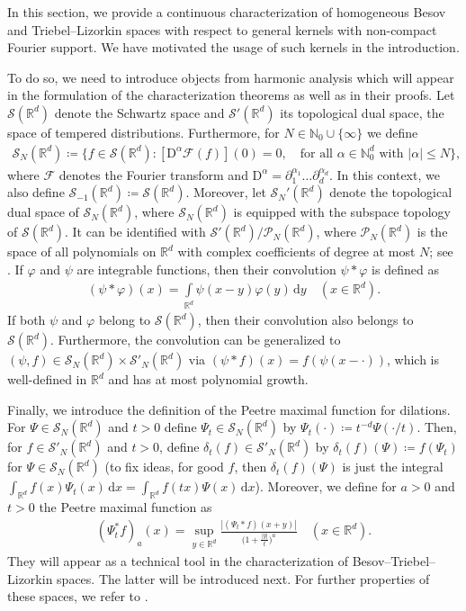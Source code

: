 \documentclass[11pt, leqno,parskip=half]{amsart}
\theoremstyle{definition}
\newcommand{\IR}{\mathbb{R}}
\newcommand{\IN}{\mathbb{N}}
\newcommand{\cF}{\mathcal{F}}
\newcommand{\cS}{\mathcal{S}}
\newcommand{\cP}{\mathcal{P}}
\newcommand{\D}{{\mathrm{D}}}
\renewcommand{\d}{\mathrm{d}}
\numberwithin{equation}{section}
\begin{document}
\noindent In this section, we provide a continuous characterization of homogeneous Besov and Triebel--Lizorkin spaces with respect to general kernels with non-compact Fourier support. We have motivated the usage of such kernels in the introduction.

To do so, we need to introduce objects from harmonic analysis which will appear in the formulation of the characterization theorems as well as in their proofs.
Let $\cS(\IR^d)$ denote the Schwartz space and $\cS'(\IR^d)$ its topological dual space, the space of tempered distributions. Furthermore, for $N\in\IN_0 \cup \{\infty\}$ we define
\begin{align*}
    \cS_N(\IR^d) \coloneqq \{ f \in \cS(\IR^d): [\D^\alpha \cF(f)](0) = 0, \quad \text{for all $\alpha\in \IN_0^d$ with $|\alpha|\leq N$}\},
\end{align*}
where $\cF$ denotes the Fourier transform and $\D^\alpha = \partial_1^{\alpha_1} \dots \partial_d^{\alpha_d}$. In this context, we also define $\cS_{-1}(\IR^d) \coloneqq \cS(\IR^d)$. Moreover, let $\cS_N'(\IR^d)$ denote the topological dual space of $\cS_N(\IR^d)$, where $\cS_N(\IR^d)$ is equipped with the subspace topology of $\cS(\IR^d)$. It can be identified with $\cS'(\IR^d)/\cP_N(\IR^d)$, where $\cP_N(\IR^d)$ is the space of all polynomials on $\IR^d$ with complex coefficients of degree at most $N$; see \cite[Chap.\@ 5]{Triebel1}. If $\varphi$ and $\psi$ are integrable functions, then their convolution $\psi\ast \varphi$ is defined as
\begin{align*}
    (\psi\ast \varphi)(x) = \int\limits_{\IR^d} \psi(x-y)\varphi(y)\,\d y \quad (x\in\IR^d).
\end{align*}
If both $\psi$ and $\varphi$ belong to $\cS(\IR^d)$, then their convolution also belongs to $\cS(\IR^d)$. Furthermore, the convolution can be generalized to $(\psi, f ) \in \cS_N(\IR^d)\times \cS'_N(\IR^d)$ via $(\psi\ast f)(x) = f(\psi(x-\cdot))$, which is well-defined in $\IR^d$ and has at most polynomial growth.

Finally, we introduce the definition of the Peetre maximal function for dilations. For $\Psi\in \cS_N(\IR^d)$ and $t>0$ define $\Psi_t\in \cS_N(\IR^d)$ by $\Psi_t(\cdot) \coloneqq t^{-d}\Psi(\cdot/t)$. Then, for $f\in \cS'_N(\IR^d)$ and $t>0$, define $\delta_t(f)\in \cS'_N(\IR^d)$ by $\delta_t(f)(\Psi) \coloneqq f(\Psi_t)$ for $\Psi\in \cS_N(\IR^d)$  (to fix ideas, for good $f$, then $\delta_t(f)(\Psi)$ is just the integral $\int_{\IR^d} f(x) \Psi_t(x)\, \d x =\int_{\IR^d} f(tx) \Psi(x)\, \d x$). Moreover, we define for $a>0$ and $t>0$ the Peetre maximal function as
\begin{align}
    \label{eq:peetre_mf}
    (\Psi_t^*f)_a(x) = \sup\limits_{y\in\IR^d} \frac{|(\Psi_t\ast f) (x+y)|}{\Big(1+\frac{|y|}{t} \Big)^a} \quad (x\in \IR^d).
\end{align}
They will appear as a technical tool in the characterization of Besov--Triebel--Lizorkin spaces. The latter will be introduced next. For further properties of these spaces, we refer to \cite[Sec.\@ 5.1]{Triebel1}.
\end{document}
